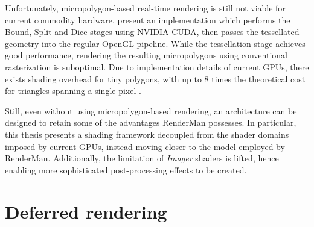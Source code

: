Unfortunately, micropolygon-based real-time rendering is still not viable for current commodity hardware. \citet{PatneyRealTimeReyes} present an implementation which performs the Bound, Split and Dice stages using NVIDIA CUDA, then passes the tessellated geometry into the regular OpenGL pipeline. While the tessellation stage achieves good performance, rendering the resulting micropolygons using conventional rasterization is suboptimal. Due to implementation details of current GPUs, there exists shading overhead for tiny polygons, with up to 8 times the theoretical cost for triangles spanning a single pixel \cite{understandingG80}.

Still, even without using micropolygon-based rendering, an architecture can be designed to retain some of the advantages RenderMan possesses. In particular, this thesis presents a shading framework decoupled from the shader domains imposed by current GPUs, instead moving closer to the model employed by RenderMan. Additionally, the limitation of \emph{Imager} shaders is lifted, hence enabling more sophisticated post-processing effects to be created.


\section{Deferred rendering}

